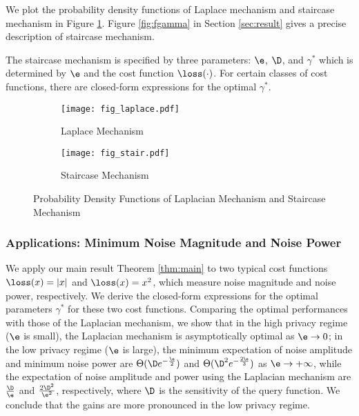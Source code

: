 We plot the probability density functions of Laplace mechanism and staircase mechanism in Figure \ref{fig:probdf}. Figure \ref{fig:fgamma} in Section \ref{sec:result} gives a precise description of staircase mechanism.

The staircase mechanism is specified by three parameters: $\e$, $\D$, and $\gamma^*$ which is determined by $\e$ and the cost function $\loss(\cdot)$. For certain classes of cost functions, there are closed-form expressions for the optimal $\gamma^*$.



\begin{figure}[h]
\begin{subfigure}[b]{0.5\linewidth}
\centering
\texttt{[image: fig\_laplace.pdf]}
\caption{ Laplace Mechanism }
\end{subfigure}
\begin{subfigure}[b]{0.5\linewidth}
\centering
\texttt{[image: fig\_stair.pdf]}
\caption{ Staircase Mechanism}
\end{subfigure}
\caption{Probability Density Functions of Laplacian Mechanism and Staircase Mechanism}
\label{fig:probdf}
\end{figure}



\subsubsection{Applications: Minimum Noise Magnitude and Noise Power}

We apply our main result Theorem \ref{thm:main} to two typical cost functions $\loss(x) = |x|$ and $\loss(x) = x^2$, which measure noise magnitude and noise power, respectively. We derive the closed-form expressions for the optimal parameters $\gamma^*$ for these two cost functions. Comparing the optimal performances with those of the Laplacian mechanism, we show that in the high privacy regime ($\e$ is small), the Laplacian mechanism is asymptotically optimal as $\e \to 0$;  in the low privacy regime ($\e$ is large), the minimum expectation of noise amplitude  and minimum noise power are $\Theta(\D e^{-\frac{\e}{2}})$ and $\Theta(\D^2 e^{-\frac{2\e}{3}})$ as $\e \to +\infty$, while  the expectation of noise amplitude and power using the Laplacian mechanism are $\frac{\D}{\e}$ and $\frac{2\D^2}{\e^2}$, respectively, where $\D$ is the sensitivity of the query function. We conclude that the gains are more pronounced in the low privacy regime.



